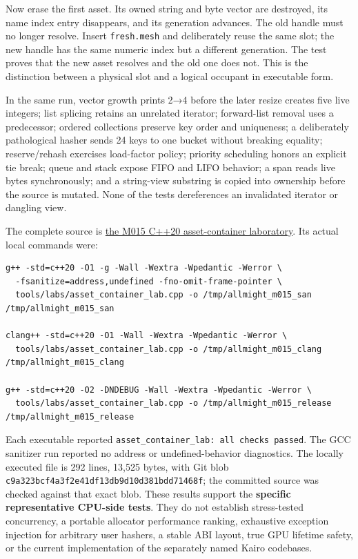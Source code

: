 Now erase the first asset. Its owned string and byte vector are destroyed, its name index entry disappears, and its generation advances. The old handle must no longer resolve. Insert \texttt{fresh.mesh} and deliberately reuse the same slot; the new handle has the same numeric index but a different generation. The test proves that the new asset resolves and the old one does not. This is the distinction between a physical slot and a logical occupant in executable form.

In the same run, vector growth prints 2→4 before the later resize creates five live integers; list splicing retains an unrelated iterator; forward-list removal uses a predecessor; ordered collections preserve key order and uniqueness; a deliberately pathological hasher sends 24 keys to one bucket without breaking equality; reserve/rehash exercises load-factor policy; priority scheduling honors an explicit tie break; queue and stack expose FIFO and LIFO behavior; a span reads live bytes synchronously; and a string-view substring is copied into ownership before the source is mutated. None of the tests dereferences an invalidated iterator or dangling view.

The complete source is \hyperref[source-file-e829cf731b17419e282775cf]{the M015 C++20 asset-container laboratory}. Its actual local commands were:

\begin{verbatim}
g++ -std=c++20 -O1 -g -Wall -Wextra -Wpedantic -Werror \
  -fsanitize=address,undefined -fno-omit-frame-pointer \
  tools/labs/asset_container_lab.cpp -o /tmp/allmight_m015_san
/tmp/allmight_m015_san

clang++ -std=c++20 -O1 -Wall -Wextra -Wpedantic -Werror \
  tools/labs/asset_container_lab.cpp -o /tmp/allmight_m015_clang
/tmp/allmight_m015_clang

g++ -std=c++20 -O2 -DNDEBUG -Wall -Wextra -Wpedantic -Werror \
  tools/labs/asset_container_lab.cpp -o /tmp/allmight_m015_release
/tmp/allmight_m015_release
\end{verbatim}

Each executable reported \texttt{asset\_container\_lab:\ all\ checks\ passed}. The GCC sanitizer run reported no address or undefined-behavior diagnostics. The locally executed file is 292 lines, 13,525 bytes, with Git blob \texttt{c9a323bcf4a3f2e41df13db9d10d381bdd71468f}; the committed source was checked against that exact blob. These results support the \textbf{specific representative CPU-side tests}. They do not establish stress-tested concurrency, a portable allocator performance ranking, exhaustive exception injection for arbitrary user hashers, a stable ABI layout, true GPU lifetime safety, or the current implementation of the separately named Kairo codebases.

